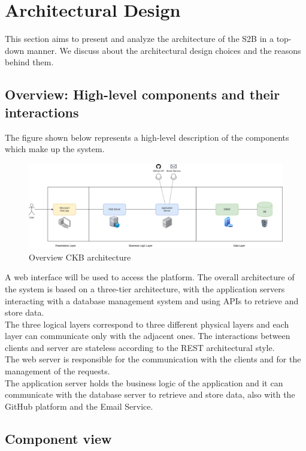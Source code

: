 \chapter{Architectural Design}
This section aims to present and analyze the architecture of the S2B in a top-down manner. 
We discuss about the architectural design choices and the reasons behind them. 

\section{Overview: High-level components and their interactions}
The figure shown below represents a high-level description of the components which make up the system.
\begin{figure}[H]
    \centering
    \includegraphics[width=\textwidth]{images/component_view/high_level.png}
    \caption{Overview CKB architecture}
    \label{fig:CKB Architecture}
\end{figure}
A web interface will be used to access the platform. 
The overall architecture of the system is based on a three-tier architecture, 
with the application servers interacting with a database management system and
using APIs to retrieve and store data. \\
The three logical layers correspond to three different physical layers and each layer can communicate only with the adjacent ones.
The interactions between clients and server are stateless according to the REST architectural style. \\
The web server is responsible for the communication with the clients and for the management of the requests. \\
The application server holds the business logic of the application and it can communicate with the database server to retrieve and store data, also with the GitHub platform and the Email Service. 

\section{Component view}

